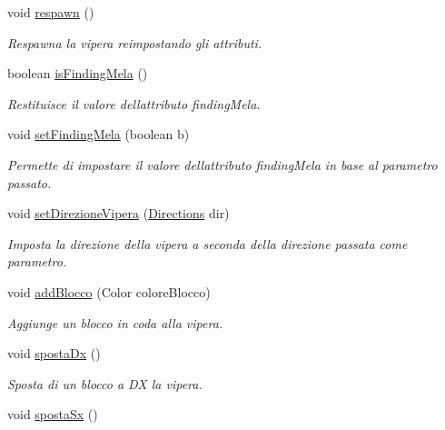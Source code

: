 \begin{DoxyCompactItemize}
void \mbox{\hyperlink{class_snake_1_1game_1_1vipera_1_1vipera_ac578ca44493fe34e6cb1b2093cf79341}{respawn}} ()
\begin{DoxyCompactList}\small\item\em Respawna la vipera reimpostando gli attributi. \end{DoxyCompactList}\item 
boolean \mbox{\hyperlink{class_snake_1_1game_1_1vipera_1_1vipera_ad36cea66da3e5e8f3a9fdd8decd6f70b}{is\+Finding\+Mela}} ()
\begin{DoxyCompactList}\small\item\em Restituisce il valore dell\textquotesingle{}attributo finding\+Mela. \end{DoxyCompactList}\item 
void \mbox{\hyperlink{class_snake_1_1game_1_1vipera_1_1vipera_a169584b55e994918baf671fe1c741e39}{set\+Finding\+Mela}} (boolean b)
\begin{DoxyCompactList}\small\item\em Permette di impostare il valore dell\textquotesingle{}attributo finding\+Mela in base al parametro passato. \end{DoxyCompactList}\item 
void \mbox{\hyperlink{class_snake_1_1game_1_1vipera_1_1vipera_a6007259ace9d33bd56b9a6193e86df39}{set\+Direzione\+Vipera}} (\mbox{\hyperlink{enum_snake_1_1game_1_1utility_1_1_directions}{Directions}} dir)
\begin{DoxyCompactList}\small\item\em Imposta la direzione della vipera a seconda della direzione passata come parametro. \end{DoxyCompactList}\item 
void \mbox{\hyperlink{class_snake_1_1game_1_1vipera_1_1vipera_aca08d818f8eb2849ca337ea2c64f344d}{add\+Blocco}} (Color colore\+Blocco)
\begin{DoxyCompactList}\small\item\em Aggiunge un blocco in coda alla vipera. \end{DoxyCompactList}\item 
void \mbox{\hyperlink{class_snake_1_1game_1_1vipera_1_1vipera_a2bb91b033817cdbd85ff3c137b3d32db}{sposta\+Dx}} ()
\begin{DoxyCompactList}\small\item\em Sposta di un blocco a DX la vipera. \end{DoxyCompactList}\item 
void \mbox{\hyperlink{class_snake_1_1game_1_1vipera_1_1vipera_a1f636041d5b342db6f92850f6d19da55}{sposta\+Sx}} ()

\end{DoxyCompactItemize}
